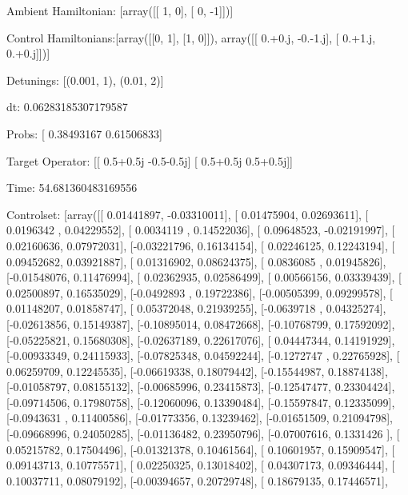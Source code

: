 \documentclass{article}
\begin{document}
    

\newpage

Ambient Hamiltonian: [array([[ 1,  0],
       [ 0, -1]])]

Control Hamiltonians:[array([[0, 1],
       [1, 0]]), array([[ 0.+0.j, -0.-1.j],
       [ 0.+1.j,  0.+0.j]])]

Detunings: [(0.001, 1), (0.01, 2)]

 dt: 0.06283185307179587

Probs: [ 0.38493167  0.61506833]

Target Operator: [[ 0.5+0.5j -0.5-0.5j]
 [ 0.5+0.5j  0.5+0.5j]]

Time: 54.681360483169556

Controlset: [array([[ 0.01441897, -0.03310011],
       [ 0.01475904,  0.02693611],
       [ 0.0196342 ,  0.04229552],
       [ 0.0034119 ,  0.14522036],
       [ 0.09648523, -0.02191997],
       [ 0.02160636,  0.07972031],
       [-0.03221796,  0.16134154],
       [ 0.02246125,  0.12243194],
       [ 0.09452682,  0.03921887],
       [ 0.01316902,  0.08624375],
       [ 0.0836085 ,  0.01945826],
       [-0.01548076,  0.11476994],
       [ 0.02362935,  0.02586499],
       [ 0.00566156,  0.03339439],
       [ 0.02500897,  0.16535029],
       [-0.0492893 ,  0.19722386],
       [-0.00505399,  0.09299578],
       [ 0.01148207,  0.01858747],
       [ 0.05372048,  0.21939255],
       [-0.0639718 ,  0.04325274],
       [-0.02613856,  0.15149387],
       [-0.10895014,  0.08472668],
       [-0.10768799,  0.17592092],
       [-0.05225821,  0.15680308],
       [-0.02637189,  0.22617076],
       [ 0.04447344,  0.14191929],
       [-0.00933349,  0.24115933],
       [-0.07825348,  0.04592244],
       [-0.1272747 ,  0.22765928],
       [ 0.06259709,  0.12245535],
       [-0.06619338,  0.18079442],
       [-0.15544987,  0.18874138],
       [-0.01058797,  0.08155132],
       [-0.00685996,  0.23415873],
       [-0.12547477,  0.23304424],
       [-0.09714506,  0.17980758],
       [-0.12060096,  0.13390484],
       [-0.15597847,  0.12335099],
       [-0.0943631 ,  0.11400586],
       [-0.01773356,  0.13239462],
       [-0.01651509,  0.21094798],
       [-0.09668996,  0.24050285],
       [-0.01136482,  0.23950796],
       [-0.07007616,  0.1331426 ],
       [ 0.05215782,  0.17504496],
       [-0.01321378,  0.10461564],
       [ 0.10601957,  0.15909547],
       [ 0.09143713,  0.10775571],
       [ 0.02250325,  0.13018402],
       [ 0.04307173,  0.09346444],
       [ 0.10037711,  0.08079192],
       [-0.00394657,  0.20729748],
       [ 0.18679135,  0.17446571],
\end{document}
